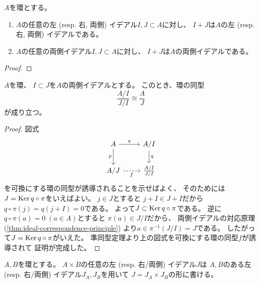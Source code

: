 \documentclass[report]{jlreq}
\begin{document}
\begin{proposition}[イデアルの和と積]
    $A$を環とする。
    \begin{enumerate}
        \item $A$の任意の左 (resp. 右, 両側) イデアル$I, J \subset A$に対し、
            $I + J$は$A$の左 (resp. 右, 両側) イデアルである。
        \item $A$の任意の両側イデアル$I, J \subset A$に対し、
            $I + J$は$A$の両側イデアルである。
    \end{enumerate}
\end{proposition}

\begin{proof}
    \TODO{}
\end{proof}

\begin{proposition}
    $A$を環、
    $I \subset J$を$A$の両側イデアルとする。
    このとき、環の同型
    \begin{equation}
        \frac{A / I}{J / I} \cong \frac{A}{J}
    \end{equation}
    が成り立つ。
\end{proposition}

\begin{proof}
    図式
    \begin{equation}
        \begin{tikzcd}
            A
                \ar{r}{\pi}
                \ar{d}[swap]{p}
                & A / I
                    \ar{d}{q} \\
            A / J
                \ar[dashed]{r}[swap]{f}
                & \frac{A / I}{J / I}
        \end{tikzcd}
    \end{equation}
    を可換にする環の同型が誘導されることを示せばよく、
    そのためには$J = \operatorname{\mathrm{Ker}} q \circ \pi$をいえばよい。
    $j \in J$とすると
    $j + I \in J + I$だから
    $q \circ \pi(j) = q(j + I) = 0$である。
    よって$J \subset \operatorname{\mathrm{Ker}} q \circ \pi$である。
    逆に$q \circ \pi(a) = 0 \; (a \in A)$とすると
    $\pi(a) \in J / I$だから、
    両側イデアルの対応原理 (\cref{thm:ideal-correspondence-principle})
    より$a \in \pi^{-1}(J / I) = J$である。
    したがって$J = \operatorname{\mathrm{Ker}} q \circ \pi$がいえた。
    準同型定理より上の図式を可換にする環の同型$f$が誘導されて
    証明が完成した。
\end{proof}

\begin{proposition}[直積環のイデアル]
    $A, B$を環とする。
    $A \times B$の任意の左 (resp. 右/両側) イデアル$J$は
    $A, B$のある左 (resp. 右/両側) イデアル$J_A, J_B$を用いて
    $J = J_A \times J_B$の形に書ける。
\end{proposition}
\end{document}
